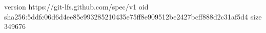 version https://git-lfs.github.com/spec/v1
oid sha256:5ddfc06d6d4ee85e993285210435e75ff8e909512be2427bcff888d2c31af5d4
size 349676
